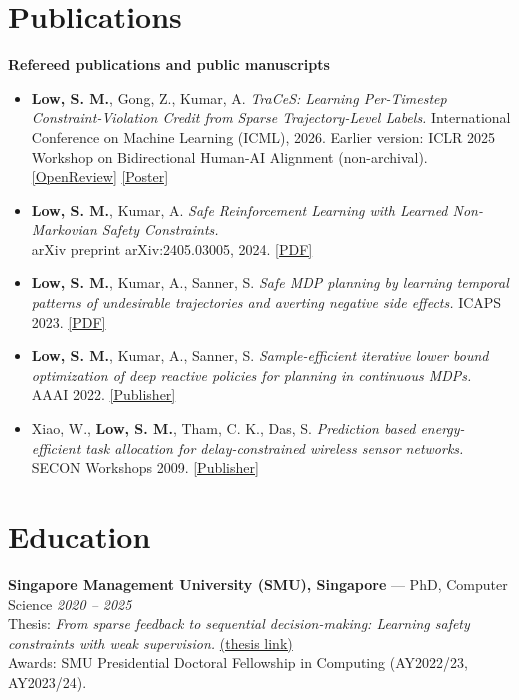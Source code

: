 \documentclass[10pt,a4paper]{article}
\newcommand{\role}[3]{\textbf{#1} --- #2 \hfill \textit{#3}\\}
\newcommand{\link}[2]{\href{#1}{#2}}
\begin{document}
\section*{Publications}
\textbf{Refereed publications and public manuscripts}
\begin{itemize}
  \item \textbf{Low, S. M.}, Gong, Z., Kumar, A. \textit{TraCeS: Learning Per-Timestep Constraint-Violation Credit from Sparse Trajectory-Level Labels.}
  International Conference on Machine Learning (ICML), 2026. Earlier version: ICLR 2025 Workshop on Bidirectional Human-AI Alignment (non-archival).
  \link{https://openreview.net/forum?id=lXnoKG4jFU}{[OpenReview]} \link{https://icml.cc/virtual/2026/poster/61935}{[Poster]}
  \item \textbf{Low, S. M.}, Kumar, A. \textit{Safe Reinforcement Learning with Learned Non-Markovian Safety Constraints.}\\
  arXiv preprint arXiv:2405.03005, 2024. \link{https://arxiv.org/pdf/2405.03005}{[PDF]}
  \item \textbf{Low, S. M.}, Kumar, A., Sanner, S. \textit{Safe MDP planning by learning temporal patterns of undesirable trajectories and averting negative side effects.}
  ICAPS 2023. \link{https://ojs.aaai.org/index.php/ICAPS/article/view/27241/27014}{[PDF]}
  \item \textbf{Low, S. M.}, Kumar, A., Sanner, S. \textit{Sample-efficient iterative lower bound optimization of deep reactive policies for planning in continuous MDPs.}
  AAAI 2022. \link{https://ojs.aaai.org/index.php/AAAI/article/view/21220}{[Publisher]}
  \item Xiao, W., \textbf{Low, S. M.}, Tham, C. K., Das, S. \textit{Prediction based energy-efficient task allocation for delay-constrained wireless sensor networks.}
  SECON Workshops 2009. \link{https://ieeexplore.ieee.org/document/5172956}{[Publisher]}
\end{itemize}

\section*{Education}
\role{Singapore Management University (SMU), Singapore}{PhD, Computer Science}{2020 -- 2025}
Thesis: \textit{From sparse feedback to sequential decision-making: Learning safety constraints with weak supervision.}
\hfill \link{https://ink.library.smu.edu.sg/etd_coll/796/}{(thesis link)}\\
Awards: SMU Presidential Doctoral Fellowship in Computing (AY2022/23, AY2023/24).\\
\end{document}
